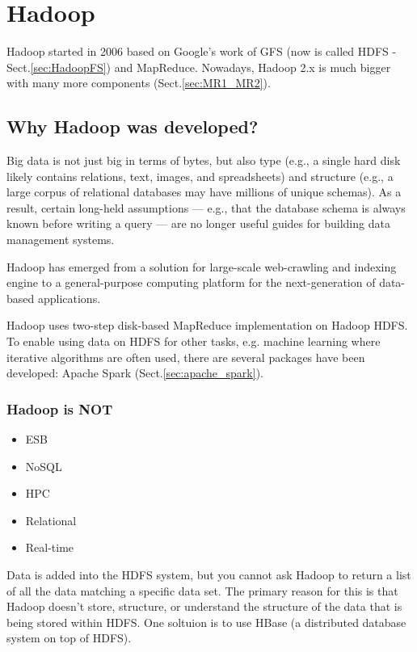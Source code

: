 \chapter{Hadoop}
\label{chap:Hadoop}

Hadoop started in 2006 based on Google's work of GFS (now is called HDFS -
Sect.\ref{sec:HadoopFS}) and MapReduce. Nowadays, Hadoop 2.x is much bigger with
many more components (Sect.\ref{sec:MR1_MR2}).

\section{Why Hadoop was developed?}

Big data is not just big in terms of bytes, but also type (e.g., a single hard
disk likely contains relations, text, images, and spreadsheets) and structure
(e.g., a large corpus of relational databases may have millions of unique
schemas). As a result, certain long-held assumptions --- e.g., that the database
schema is always known before writing a query --- are no longer useful guides
for building data management systems.

Hadoop has emerged from a solution for large-scale web-crawling and indexing
engine to a general-purpose computing platform for the next-generation of
data-based applications. 

Hadoop uses two-step disk-based MapReduce implementation on Hadoop HDFS. To
enable using data on HDFS for other tasks, e.g. machine learning where iterative
algorithms are often used, there are several packages have been developed:
Apache Spark (Sect.\ref{sec:apache_spark}).

\subsection{Hadoop is NOT}

\begin{itemize}
  \item ESB
  \item NoSQL
  \item HPC
  \item Relational 
  \item Real-time
\end{itemize}

Data is added into the HDFS system, but you cannot ask Hadoop to return a list
of all the data matching a specific data set. 
The primary reason for this is that Hadoop doesn't store, structure, or
understand the structure of the data that is being stored within HDFS. One
soltuion is to use HBase (a distributed database system on top of HDFS). 

